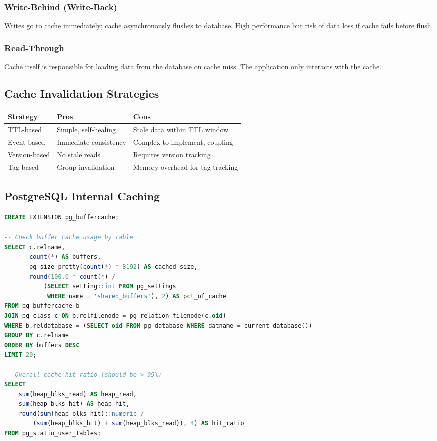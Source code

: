 \documentclass[12pt,a4paper]{article}
\begin{document}
\subsubsection{Write-Behind (Write-Back)}

Writes go to cache immediately; cache asynchronously flushes to database. High performance but risk of data loss if cache fails before flush.

\subsubsection{Read-Through}

Cache itself is responsible for loading data from the database on cache miss. The application only interacts with the cache.

\subsection{Cache Invalidation Strategies}

\begin{center}
\begin{tabular}{lp{4cm}p{4cm}}
\toprule
\textbf{Strategy} & \textbf{Pros} & \textbf{Cons} \\
\midrule
TTL-based & Simple, self-healing & Stale data within TTL window \\
Event-based & Immediate consistency & Complex to implement, coupling \\
Version-based & No stale reads & Requires version tracking \\
Tag-based & Group invalidation & Memory overhead for tag tracking \\
\bottomrule
\end{tabular}
\end{center}

\subsection{PostgreSQL Internal Caching}

\begin{lstlisting}[language=SQL, caption={PostgreSQL buffer cache analysis}]
CREATE EXTENSION pg_buffercache;

-- Check buffer cache usage by table
SELECT c.relname,
       count(*) AS buffers,
       pg_size_pretty(count(*) * 8192) AS cached_size,
       round(100.0 * count(*) /
           (SELECT setting::int FROM pg_settings
            WHERE name = 'shared_buffers'), 2) AS pct_of_cache
FROM pg_buffercache b
JOIN pg_class c ON b.relfilenode = pg_relation_filenode(c.oid)
WHERE b.reldatabase = (SELECT oid FROM pg_database WHERE datname = current_database())
GROUP BY c.relname
ORDER BY buffers DESC
LIMIT 20;

-- Overall cache hit ratio (should be > 99%)
SELECT
    sum(heap_blks_read) AS heap_read,
    sum(heap_blks_hit) AS heap_hit,
    round(sum(heap_blks_hit)::numeric /
        (sum(heap_blks_hit) + sum(heap_blks_read)), 4) AS hit_ratio
FROM pg_statio_user_tables;
\end{lstlisting}
\end{document}
